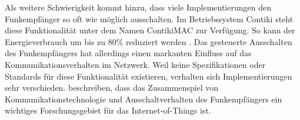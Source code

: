 Als weitere Schwierigkeit kommt hinzu, dass viele Implementierungen den Funkempfänger so oft wie möglich ausschalten. Im Betriebssystem Contiki steht diese Funktionalität unter dem Namen ContikiMAC zur Verfügung. So kann der Energieverbrauch um bis zu 80\% reduziert werden \citep{dunkels11contikimac}. Das gesteuerte Ausschalten des Funkempfängers hat allerdings einen markanten Einfluss auf das Kommunikationsverhalten im Netzwerk. Weil keine Spezifikationen oder Standards für diese Funktionalität existieren, verhalten sich Implementierungen sehr verschieden. \textcite{dunkels11adhoc} beschreiben, dass das Zusammenspiel von Kommunikationstechnologie und Ausschaltverhalten des Funkempfängers ein wichtiges Forschungsgebiet für das Internet-of-Things ist.



